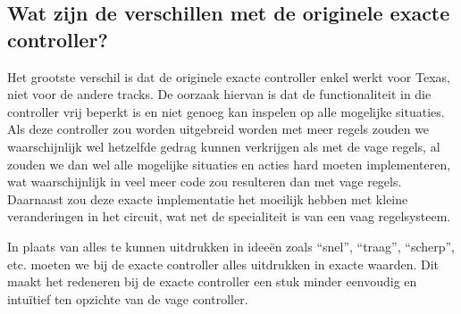 \subsection{Wat zijn de verschillen met de originele exacte controller?}
Het grootste verschil is dat de originele exacte controller enkel werkt voor 
Texas, niet voor de andere tracks. De oorzaak hiervan is dat de functionaliteit 
in die controller vrij beperkt is en niet genoeg kan inspelen op alle mogelijke 
situaties. Als deze controller zou worden uitgebreid worden met meer regels 
zouden we waarschijnlijk wel hetzelfde gedrag kunnen verkrijgen als met de 
vage regels, al zouden we dan wel alle mogelijke situaties en acties hard 
moeten implementeren, wat waarschijnlijk in veel meer code zou resulteren dan 
met vage regels. Daarnaast zou deze exacte implementatie het moeilijk hebben met kleine veranderingen in het circuit, wat net de specialiteit is van een vaag regelsysteem. 

In plaats van alles te kunnen uitdrukken in ideeën zoals ``snel'', ``traag'', 
``scherp'', etc. moeten we bij de exacte controller alles uitdrukken in exacte 
waarden. Dit maakt het redeneren bij de exacte controller een stuk minder 
eenvoudig en intuïtief ten opzichte van de vage controller.